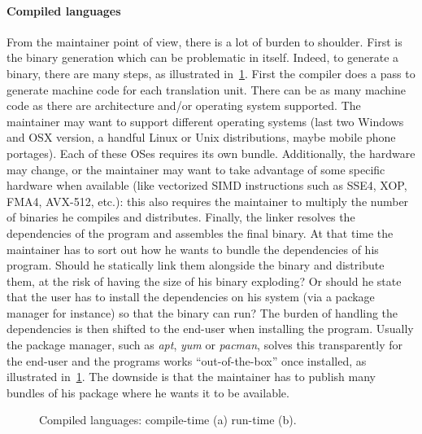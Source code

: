 \paragraph{Compiled languages} From the maintainer point of view, there is a lot of burden to shoulder. First is the
binary generation which can be problematic in itself. Indeed, to generate a binary, there are many steps, as illustrated
in~\cref{fig:static.dynamic.compiled}. First the compiler does a pass to generate machine code for each translation
unit. There can be as many machine code as there are architecture and/or operating system supported. The maintainer may
want to support different operating systems (last two Windows and OSX version, a handful Linux or Unix distributions,
maybe mobile phone portages). Each of these OSes requires its own bundle. Additionally, the hardware may change, or the
maintainer may want to take advantage of some specific hardware when available (like vectorized SIMD instructions such
as SSE4, XOP, FMA4, AVX-512, etc.): this also requires the maintainer to multiply the number of binaries he compiles and
distributes. Finally, the linker resolves the dependencies of the program and assembles the final binary. At that time
the maintainer has to sort out how he wants to bundle the dependencies of his program. Should he statically link them
alongside the binary and distribute them, at the risk of having the size of his binary exploding? Or should he state
that the user has to install the dependencies on his system (via a package manager for instance) so that the binary can
run? The burden of handling the dependencies is then shifted to the end-user when installing the program. Usually the
package manager, such as \emph{apt}, \emph{yum} or \emph{pacman}, solves this transparently for the end-user and the
programs works ``out-of-the-box'' once installed, as illustrated in~\cref{fig:static.dynamic.compiled}. The downside is
that the maintainer has to publish many bundles of his package where he wants it to be available.

\begin{figure}[htbp]
  \centering
  \hfil
  \caption{Compiled languages: compile-time (a) \vs run-time (b).}
  \label{fig:static.dynamic.compiled}
\end{figure}

